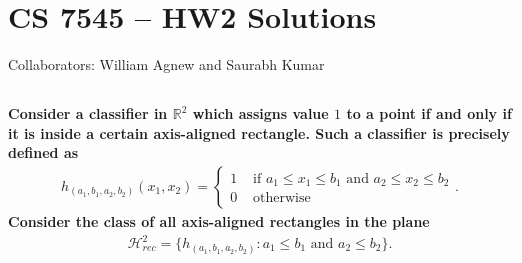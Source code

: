 \documentclass[a4paper,12pt]{article}
\theoremstyle{remark}
\begin{document}
\section*{CS 7545 -- HW2 Solutions}
Collaborators: William Agnew and Saurabh Kumar
\subsection{}
    \boldmath\textbf{Consider a classifier in $\mathbb{R}^2$ which assigns value $1$ to a point if and only if it is inside a certain axis-aligned rectangle. Such a classifier is precisely defined as
    \begin{align*}
        h_{(a_1, b_1, a_2, b_2)}(x_1, x_2) = \begin{cases}
            1 &\text{ if } a_1 \leq x_1 \leq b_1 \text{ and } a_2 \leq x_2 \leq b_2 \\
            0 &\text{ otherwise}
        \end{cases}.
    \end{align*}
    Consider the class of all axis-aligned rectangles in the plane
    \begin{align*}
        \mathcal{H}_{rec}^2 = \{ h_{(a_1, b_1, a_2, b_2)} : a_1 \leq b_1 \text{ and } a_2 \leq b_2 \}.
    \end{align*}
    }\unboldmath \par
\end{document}
